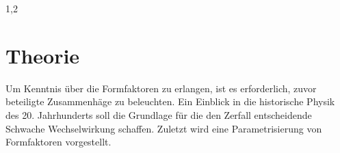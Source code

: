 \documentclass[11pt,a4paper,twoside]{report}
\begin{document}
\begin{spacing}{1,2}

\chapter{Theorie}
Um Kenntnis über die Formfaktoren zu erlangen, ist es erforderlich, zuvor beteiligte Zusammenhäge zu beleuchten. Ein Einblick in die historische Physik
des 20. Jahrhunderts soll die Grundlage für die den Zerfall entscheidende Schwache Wechselwirkung schaffen. Zuletzt wird eine Parametrisierung von Formfaktoren
vorgestellt.


\end{spacing}
\end{document}

